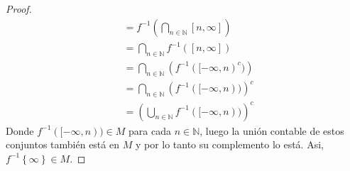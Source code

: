 \documentclass[spanish,12pt,a4paper,openany]{book}
\begin{document}
\begin{enumerate}
\begin{proof}
\begin{align*}
				&= f^{-1} \displaystyle\left(\bigcap _{n \in \mathbb{N}} [n, \infty ] \right)\\
				&=\displaystyle \bigcap_{n \in \mathbb{N}} f^{-1}([n, \infty])\\
				&= \displaystyle \bigcap_{n \in \mathbb{N}} \left(f^{-1}([-\infty, n)^{c}) \right)\\
				&= \displaystyle \bigcap_{n \in \mathbb{N}} \left(f^{-1}([-\infty, n)) \right)^{c}\\
				&= \displaystyle \left( \bigcup_{n \in \mathbb{N}} f^{-1}([-\infty,n)) \right)^{c}
			\end{align*}
			Donde $f^{-1}([- \infty, n)) \in M$ para cada $n \in \mathbb{N}$, luego la unión contable de estos conjuntos también está en $M$ y por lo tanto su complemento lo está. Asi, $f^{-1} \left\{ \infty \right\} \in M.$
		\end{proof}
	\end{enumerate}
\end{document}
